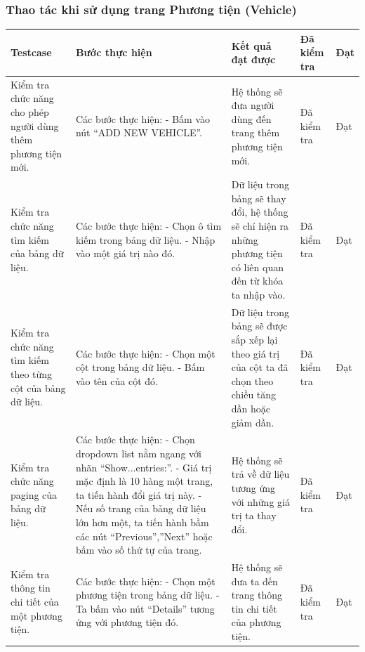 \documentclass{article}
\begin{document}
\subsubsection{Thao tác khi sử dụng trang Phương tiện (Vehicle) }
\begin{longtable}{ | p{} |p{} | p{}  | p{}  | p{}  | } 
\hline
\textbf{Testcase}& \textbf{Bước thực hiện}& \textbf{Kết quả đạt được} & \textbf{Đã kiểm tra}& \textbf{Đạt} \\ 
\hline
\hline
Kiểm tra chức năng cho phép người dùng thêm phương tiện mới. &
Các bước thực hiện: \newline
- Bấm vào nút “ADD NEW VEHICLE”.
&
Hệ thống sẽ đưa người dùng đến trang thêm phương tiện mới. &
Đã kiểm tra &
Đạt \\

\hline
Kiểm tra chức năng tìm kiếm của bảng dữ liệu. &
Các bước thực hiện: \newline
- Chọn ô tìm kiếm trong bảng dữ liệu. \newline
- Nhập vào một giá trị nào đó.	
&
Dữ liệu trong bảng sẽ thay đổi, hệ thống sẽ chỉ hiện ra những phương tiện có liên quan đến từ khóa ta nhập vào. &
Đã kiểm tra &
Đạt \\

\hline
Kiểm tra chức năng tìm kiếm theo từng cột của bảng dữ liệu. &
Các bước thực hiện: \newline
- Chọn một cột trong bảng dữ liệu.  \newline
- Bấm vào tên của cột đó. 
&
Dữ liệu trong bảng sẽ được sắp xếp lại theo giá trị của cột ta đã chọn theo chiều tăng dần hoặc giảm dần. &
Đã kiểm tra &
Đạt \\

\hline
Kiểm tra chức năng paging của bảng dữ liệu. &
Các bước thực hiện: \newline
- Chọn dropdown list nằm ngang với nhãn “Show...entries:”.   \newline
- Giá trị mặc định là 10 hàng một trang, ta tiến hành đổi giá trị này. \newline
- Nếu số trang của bảng dữ liệu lớn hơn một, ta tiến hành bầm các nút “Previous”,”Next” hoặc bấm vào số thứ tự của trang.
&
Hệ thống sẽ trả về dữ liệu tương ứng với những giá trị ta thay đổi. &
Đã kiểm tra &
Đạt \\

\hline
Kiểm tra thông tin chi tiết của một phương tiện. &
Các bước thực hiện: \newline
- Chọn một phương tiện trong bảng dữ liệu.   \newline
- Ta bấm vào nút “Details” tương ứng với phương tiện đó. 
&
Hệ thống sẽ đưa ta đến trang thông tin chi tiết của phương tiện. &
Đã kiểm tra &
Đạt \\


\end{longtable}
\end{document}
